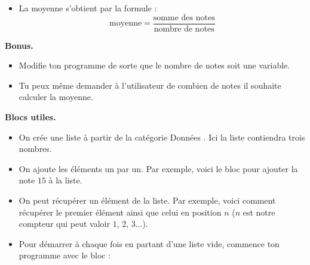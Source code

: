 \documentclass[class=report,crop=false, 12pt]{standalone}
\begin{document}
\begin{activite}
\begin{itemize}
  \item La moyenne s'obtient par la formule :
  $$\text{moyenne} = \frac{\text{somme des notes}}{\text{nombre de notes}}$$
\end{itemize}


\bigskip

\textbf{Bonus.}
\begin{itemize}
  \item Modifie ton programme de sorte que le nombre de notes soit une variable. 
  
  \item Tu peux même demander à l'utilisateur de combien de notes il souhaite calculer la moyenne.
  
\end{itemize}

\bigskip

\textbf{Blocs utiles.}

\begin{itemize}
  \item On crée une liste à partir de la catégorie \og Données \fg{}. Ici la liste  contiendra trois nombres.
  
 
  \item On ajoute les éléments un par un. Par exemple, voici le bloc pour ajouter la note $15$ à la liste.
\begin{center}
\qquad\qquad\qquad
\begin{scratch}
\end{scratch}
\end{center} 

  \item On peut récupérer un élément de la liste. Par exemple, voici comment récupérer le premier élément ainsi que celui en position $n$
  ($n$ est notre compteur qui peut valoir $1$, $2$, $3$...).
\begin{center}
  \qquad\qquad\qquad
\end{center}   
  \item Pour démarrer à chaque fois en partant d'une liste vide, commence ton programme avec le bloc :
\begin{center}
\begin{scratch}
\end{scratch}
\end{center}   
\end{itemize}

\end{activite}
\end{document}
